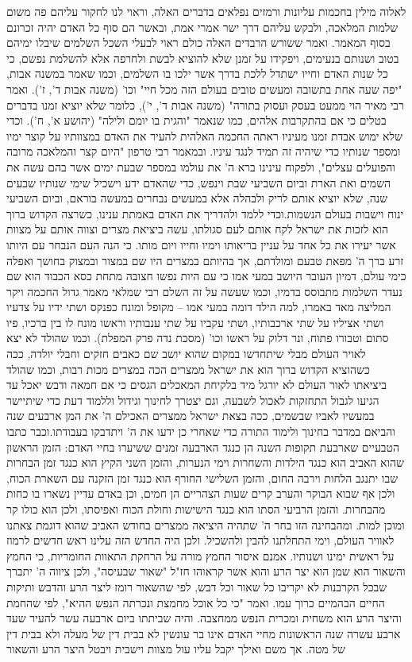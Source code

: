 \documentclass[12pt, openany]{book}
\begin{document}
לאלוה מילין בחכמות עליונות ורמזים נפלאים בדברים האלה, וראוי לנו לחקור עליהם פה משום שלמות המלאכה, ולבקש עליהם דרך ישר אמרי אמת, ובאשר הם סוף כל האדם יהיה זכרונם בסוף המאמר. ואמר ששורש הרבדים האלה כולם ראוי לבעלי השכל השלמים שיבלו ימיהם בטוב ושנותם בנעימים, ויפקידו על זמנן שלא להוציא לבשת ולחרפה אלא להשלמת נפשם, כי כל שנות האדם וחייו ישתדל ללכת בדרך אשר ילכו בו השלמים, וכמו שאמר במשנה אבות, "יפה שעה אחת בתשובה ומעשים טובים בעולם הזה מכל חיי" וכו' (משנה אבות ד', ז'). ואמר רבי מאיר הוי ממעט בעסק ועסוק בתורה" (משנה אבות ד', י'), כלומר שלא יוציא זמנו בדברים בטלים כי אם בהתקרבות אלהים, כמו שנאמר "והגית בו יומם ולילה" (יהושע א', ח'). וכדי שלא ימוש אבדת זמנו מעיניו ראתה החכמה האלהית להעיר את האדם במצוותיו על קוצר ימיו ומספר שנותיו כדי שיהיה זה תמיד לנגד עיניו. ובמאמר רבי טרפון "היום קצר והמלאכה מרובה והפועלים עצלים", ולפקוח עינינו ברא ה' את עולמו במספר שבעת ימים אשר בהם עשה את השמים ואת הארת וביום השביעי שבת וינפש, כדי שהאדם ידע וישכיל שימי שנותיו שבעים שנה, שלא יוציא אותם לריק ולבהלה אלא במעשים נבחרים במעשה בוראם, וביום השביעי ינוח וישבות בעולם הנשמות.וכדי ללמד ולהדריך את האדם באמתת ענינו, כשרצה הקדוש ברוך הוא לזכות את ישראל לקח אותם לעם סגולתו, עשה ביציאת מצרים וצווה אותם על מצוות אשר יעירו את כל אחד על עניין בריאותו וימיו וחייו ויום מותו. כי הנה העם הנבחר עם היותו זרע ברך ה' מפאת טבעם ומולדתם, אך בהיותם במצרים היו שם במצור ובמצוק בחושך ואפלה כימי עולם, דמיון העובר היושב במעי אמו כי עם היות נפשו חצובה מתחת כסא הכבוד הוא שם נעדר השלמות מתבוסס בדמיו, וכמו שעשה על זה השלם רבי שמלאי מאמר גדול החכמה ויקר המליצה מאד באמרו, למה הילד דומה במעי אמו – מקופל ומונח כפנקס ושתי ידיו על צדעיו ושתי אציליו על שתי ארכבותיו, ושתי עקביו על שתי ענבותיו וראשו מונח לו בין ברכיו, פיו סתום וטבורו פתוח, ונר דלוק על ראשו וכו' (מסכת נדה פרק המפלת). וכמו שהולד לא יצא לאויר העולם מבלי שיתחדשו במקום שהוא יושב שם כאבים חזקים וחבלי יולדה, ככה כשהוציא הקדוש ברוך הוא את ישראל ממצרים הכה במצרים מכות רבות, וכמו שהולד ביציאתו לאור העולם לא יורגל מיד בלקיחת המאכלים הגסים כי אם חמאה ודבש יאכל עד הגיעו לגבול התחזקות לאכול לשבעה, וגם יצטרך לחינוך וגידול וללמוד דעת כדי שיתיישר במעשיו לאביו שבשמים, ככה בצאת ישראל ממצרים האכילם ה' את המן ארבעים שנה והביאם במדבר בחינוך ולימוד התורה כדי שאחרי כן ידעו את ה' ויתדבקו בעבודתו.וכבר כתבו הטבעיים שארבעת תקופות השנה הן כנגד הארבעה זמנים ששיערו בחיי האדם: הזמן הראשון שהוא האביב הוא כנגד הילדות והשחרות וימי הנערות, והזמן השני הקיץ הוא כנגד זמן הבחרות שבו יתנגב הלחות וירבה החום, והזמן השלישי החורף הוא כנגד זמן הזקנה עם השארת הכוח, ולכן אף שבוא הבוקר  והערב קרים שעות הצהריים הן חמים, וכן באדם עדיין נשארו בו כחות מהבחרות. והזמן הרביעי הסתו הוא כנגד הישישות וחולת הכוח ואפיסתו, ולכן הוא כולו קר ומוכן למות. ומהבחינה הזו בחר ה' שתהיה היציאה ממצרים בחודש האביב שהוא דוגמת צאתנו לאוויר העולם, וימי התחלתנו להבין ולהשכיל. ולכן היה החדש הזה עלינו ראש חדשים לרמוז על ראשית ימינו ושנותיו.  אמנם איסור החמץ מורה על הרחקת התאוות החומריות, כי החמץ והשאור הוא שמן הוא יצר הרע והוא אשר קראוהו חז"ל "שאור שבעיסה", ולכן ציווה ה' יתברך שבכל הקרבנות לא יקריבו כל שאור וכל דבש, לפי שהשאור רומז ליצר הרע והדבש ותיקות החיים הבהמיים כרוך עמו. ואמר "כי כל אוכל מחמצת ונכרתה הנפש ההיא", לפי שהחמת והיצר הרע הוא משחית ומכרית הנפש ממחצבה. והיה שביתתו ביום ארבעה עשר להעיר שעד ארבע עשרה שנה הראשונות מחיי האדם אינו בר עונשין לא בבית דין של מעלה ולא בבית דין של מטה. אך משם ואילך יקבל עליו עול מצוות וישבית ויבטל היצר הרע והשאור 
\end{document}
